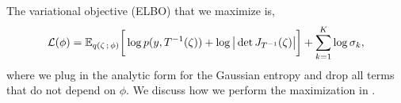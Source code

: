 The variational objective (ELBO) that we maximize is,
\[
  \mathcal{L}(\phi)
  =
  \E_{q(\zeta\,;\,\phi)}
  \bigg[
  \log p (y, T^{-1}(\zeta))
  +
  \log \big| \det J_{T^{-1}}(\zeta) \big|
  \bigg]
  +
  \sum_{k=1}^K \log \sigma_k,
\]
where we plug in the analytic form for the Gaussian entropy and drop all terms
that do not depend on $\phi$. We discuss how we perform the maximization in
.























